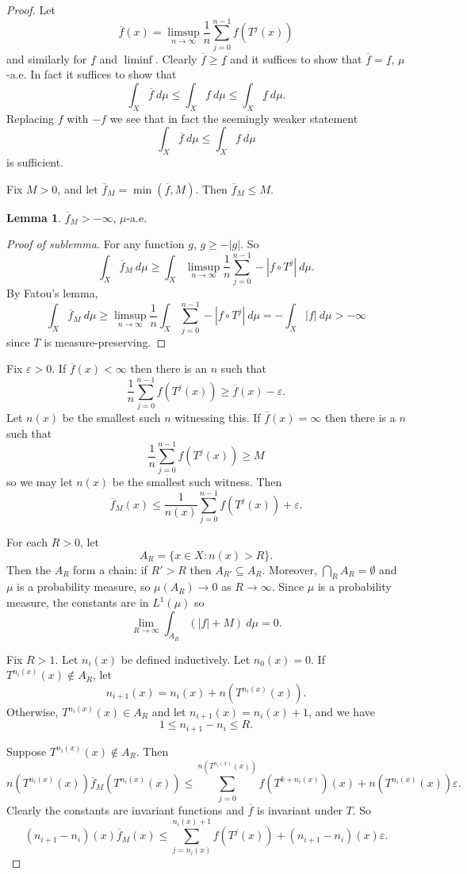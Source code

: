 \documentclass[12pt]{report}
\theoremstyle{definition}
\newtheorem{lemma}[theorem]{Lemma}
\begin{document}
\begin{proof}
Let
$$\overline f(x) = \limsup_{n \to \infty} \frac{1}{n} \sum_{j=0}^{n-1} f(T^j(x))$$
and similarly for $\underline f$ and $\liminf$. Clearly $\overline f \geq \underline f$ and it suffices to show that $\overline f = \underline f$, $\mu$-a.e. In fact it suffices to show that
$$\int_X \overline f ~d\mu \leq \int_X f~d\mu \leq \int_X \underline f ~d\mu.$$
Replacing $f$ with $-f$ we see that in fact the seemingly weaker statement
$$\int_X \overline f ~d\mu \leq \int_X f~d\mu$$
is sufficient.

Fix $M > 0$, and let $\overline f_M = \min(\overline f, M)$. Then $\overline f_M \leq M$.
\begin{lemma}
$\overline f_M > -\infty$, $\mu$-a.e.
\end{lemma}
\begin{proof}[Proof of sublemma]
For any function $g$, $g \geq -|g|$. So
$$\int_X \overline f_M ~d\mu \geq \int_X \limsup_{n \to \infty} \frac{1}{n} \sum_{j=0}^{n-1} -|f \circ T^j| ~d\mu.$$
By Fatou's lemma,
$$\int_X \overline f_M ~d\mu \geq \limsup_{n \to \infty} \frac{1}{n} \int_X \sum_{j=0}^{n-1} -|f \circ T^j| ~d\mu = -\int_X |f| ~d\mu > -\infty$$
since $T$ is measure-preserving.
\end{proof}

Fix $\varepsilon > 0$. If $\overline f(x) < \infty$ then there is an $n$ such that
$$\frac{1}{n} \sum_{j=0}^{n-1} f(T^j(x)) \geq \overline f(x) - \varepsilon.$$
Let $n(x)$ be the smallest such $n$ witnessing this. If $\overline f(x) = \infty$ then there is a $n$ such that
$$\frac{1}{n} \sum_{j=0}^{n-1} f(T^j(x)) \geq M$$
so we may let $n(x)$ be the smallest such witness. Then
$$\overline f_M(x) \leq \frac{1}{n(x)} \sum_{j=0}^{n-1} f(T^j(x)) + \varepsilon.$$

For each $R > 0$, let
$$A_R = \{x \in X: n(x) > R\}.$$
Then the $A_R$ form a chain: if $R' > R$ then $A_{R'} \subseteq A_R$. Moreover, $\bigcap_R A_R = \emptyset$ and $\mu$ is a probability measure, so $\mu(A_R) \to 0$ as $R \to \infty$. Since $\mu$ is a probability measure, the constants are in $L^1(\mu)$ so
$$\lim_{R \to \infty} \int_{A_R} (|f| + M) ~d\mu = 0.$$

Fix $R > 1$. Let $n_i(x)$ be defined inductively. Let $n_0(x) = 0$. If $T^{n_i(x)}(x) \notin A_R$, let
$$n_{i+1}(x) = n_i(x) + n(T^{n_i(x)}(x)).$$
Otherwise, $T^{n_i(x)}(x) \in A_R$ and let $n_{i+1}(x) = n_i(x) + 1$, and we have
$$1 \leq n_{i+1} - n_i \leq R.$$

Suppose $T^{n_i(x)}(x) \notin A_R$. Then
$$n(T^{n_i(x)}(x))\overline f_M(T^{n_i(x)}(x)) \leq \sum_{j=0}^{n(T^{n_i(x)}(x))} f(T^{k + n_i(x)})(x) + n(T^{n_i(x)}(x))\varepsilon.$$
Clearly the constants are invariant functions and $\overline f$ is invariant under $T$. So
$$(n_{i+1} - n_i)(x) \overline f_M(x) \leq \sum_{j=n_i(x)}^{n_i(x) + 1} f(T^j(x)) + (n_{i+1} - n_i)(x) \varepsilon.$$


\end{proof}
\end{document}
